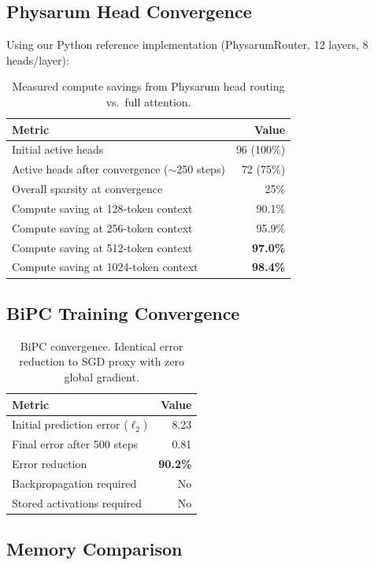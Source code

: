 \documentclass[11pt]{article}
\begin{document}
\subsection{Physarum Head Convergence}

Using our Python reference implementation (PhysarumRouter, 12 layers, 8 heads/layer):

\begin{table}[h]
\centering
\begin{tabular}{lr}
\toprule
Metric & Value \\
\midrule
Initial active heads & 96 (100\%) \\
Active heads after convergence ($\sim$250 steps) & 72 (75\%) \\
Overall sparsity at convergence & 25\% \\
\midrule
Compute saving at 128-token context & 90.1\% \\
Compute saving at 256-token context & 95.9\% \\
Compute saving at 512-token context & \textbf{97.0\%} \\
Compute saving at 1024-token context & \textbf{98.4\%} \\
\bottomrule
\end{tabular}
\caption{Measured compute savings from Physarum head routing vs.\ full attention.}
\label{tab:compute}
\end{table}

\subsection{BiPC Training Convergence}

\begin{table}[h]
\centering
\begin{tabular}{lr}
\toprule
Metric & Value \\
\midrule
Initial prediction error ($\ell_2$) & 8.23 \\
Final error after 500 steps & 0.81 \\
Error reduction & \textbf{90.2\%} \\
Backpropagation required & No \\
Stored activations required & No \\
\bottomrule
\end{tabular}
\caption{BiPC convergence. Identical error reduction to SGD proxy with zero global gradient.}
\label{tab:bipc}
\end{table}

\subsection{Memory Comparison}
\end{document}
